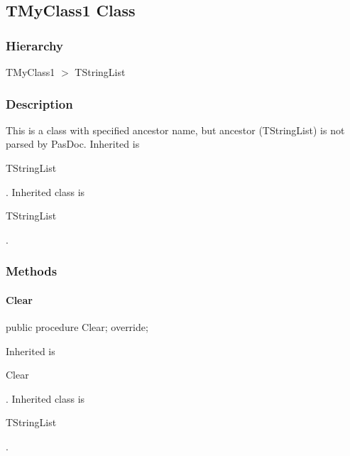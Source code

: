 \documentclass{report}
\newif\ifpdf
\begin{document}
\subsection*{TMyClass1 Class}
\fi
\label{warning_inherited_test.TMyClass1}
\subsubsection*{\large{\textbf{Hierarchy}}\normalsize\hspace{1ex}\hfill}
TMyClass1 {$>$} TStringList
\subsubsection*{\large{\textbf{Description}}\normalsize\hspace{1ex}\hfill}
This is a class with specified ancestor name, but ancestor (TStringList) is not parsed by PasDoc. Inherited is \begin{ttfamily}TStringList\end{ttfamily}. Inherited class is \begin{ttfamily}TStringList\end{ttfamily}.\subsubsection*{\large{\textbf{Methods}}\normalsize\hspace{1ex}\hfill}
\paragraph*{Clear}\hspace*{\fill}

\label{warning_inherited_test.TMyClass1-Clear}
\begin{list}{}{
\setlength{\itemindent}{0cm}
\setlength{\listparindent}{0cm}
\setlength{\leftmargin}{\evensidemargin}
\addtolength{\leftmargin}{\tmplength}
\settowidth{\labelsep}{X}
\addtolength{\leftmargin}{\labelsep}
\setlength{\labelwidth}{\tmplength}
}
\item[\textbf{Declaration}\hfill]
\ifpdf
\begin{flushleft}
\fi
\begin{ttfamily}
public procedure Clear; override;\end{ttfamily}

\ifpdf
\end{flushleft}
\fi

\par
\item[\textbf{Description}]
Inherited is \begin{ttfamily}Clear\end{ttfamily}. Inherited class is \begin{ttfamily}TStringList\end{ttfamily}.

\end{list}
\ifpdf
\end{document}
